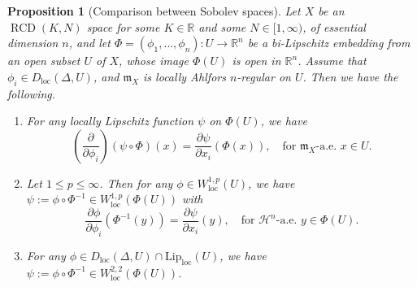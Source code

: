 \documentclass[11pt,reqno]{amsart}
\newtheorem{proposition}[theorem]{Proposition}
\theoremstyle{definition}
\numberwithin{equation}{section}
\newcommand{\meas}{\mathfrak{m}}
\DeclareMathOperator{\loc}{loc}
\DeclareMathOperator{\RCD}{RCD}
\newcommand{\haus}{\mathscr{H}}
\begin{document}
\begin{proposition}[Comparison between Sobolev spaces]\label{deri}
Let $X$ be an $\RCD(K, N)$ space for some $K\in \mathbb{R}$ and some $N \in [1, \infty)$, of essential dimension $n$, and let $\Phi=(\phi_1, \ldots, \phi_n):U \to \mathbb{R}^n$ be a bi-Lipschitz embedding from an open subset $U$ of $X$, whose image $\Phi(U)$ is open in $\mathbb{R}^n$. Assume that $\phi_i \in D_{\loc}(\Delta, U)$, and  $\meas_X$ is locally Ahlfors $n$-regular on $U$. Then we have the following.
\begin{enumerate}
\item For any locally Lipschitz function $\psi$ on $\Phi(U)$, we have
\begin{equation}\label{form}
\left(\frac{\partial}{\partial \phi_i} \right)(\psi \circ \Phi)(x)=\frac{\partial \psi}{\partial x_i}(\Phi(x)),\quad \text{for $\meas_X$-a.e. $x \in U$.}
\end{equation}
\item Let $1\le p\le \infty$. 
Then for any $\phi \in W^{1,p}_{\loc}(U)$, we have $\psi := \phi \circ \Phi^{-1} \in W^{1,p}_{\loc}(\Phi(U))$ with
\begin{equation}\label{rhs}
\frac{\partial \phi}{\partial \phi_i}(\Phi^{-1}(y))=\frac{\partial \psi}{\partial x_i}(y),\quad \text{for $\haus^n$-a.e. $y \in \Phi(U)$.}
\end{equation}
\item For any $\phi \in D_{\loc}(\Delta, U)\cap \mathrm{Lip}_{\loc}(U)$, 
we have $\psi := \phi \circ \Phi^{-1}\in W^{2,2}_{\loc}(\Phi(U))$.

\end{enumerate}
\end{proposition}
\end{document}
